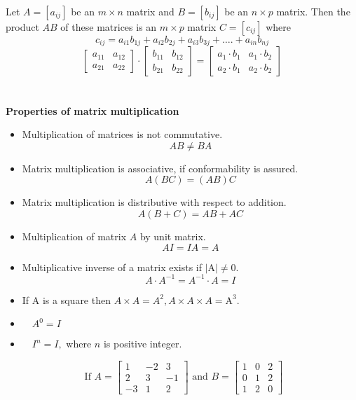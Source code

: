 	 Let $A=\left[a_{i j}\right]$ be an $m \times n$ matrix and $B=\left[b_{i j}\right]$ be an $n \times p$ matrix. Then the product $A B$ of these matrices is an $m \times p$ matrix $C=\left[c_{i j}\right]$ where
	 $$
	 c_{i j}=a_{i 1} b_{1 j}+a_{i 2} b_{2 j}+a_{i 3} b_{3 j}+\ldots .+a_{i n} b_{n j}
	 $$
	 $$\left[\begin{array}{ll}a_{1 1} & a_{1 2} \\ a_{2 1} & a_{2 2 }\end{array}\right] \cdot\left[\begin{array}{ll} b_{1 1} &  b_{1 2} \\b_{2 1} & b_{22 }\end{array}\right]=\left[\begin{array}{ll}{a_{1}} \cdot {b_{1}} & {a_{1}} \cdot b_{2} \\ {a_{2}} \cdot {b_{1}} & {a_{2}} \cdot {b_{2}}\end{array}\right]$$\\\\
	 \textbf{Properties of matrix multiplication}
	 \begin{itemize}
	 	\item Multiplication of matrices is not commutative.
	 	$$
	 	A B \neq B A
	 	$$
	 	\item Matrix multiplication is associative, if conformability is assured.
	 	$$
	 	A(B C)=(A B) C
	 	$$
	 	\item  Matrix multiplication is distributive with respect to addition.
	 	$$
	 	A(B+C)=A B+A C
	 	$$
	 	\item Multiplication of matrix $A$ by unit matrix.
	 	$$
	 	A I=I A=A
	 	$$
	 	\item Multiplicative inverse of a matrix exists if $|\mathrm{A}| \neq 0$.
	 	$$
	 	A \cdot A^{-1}=A^{-1} \cdot A=I
	 	$$
	 	\item  If $\mathrm{A}$ is a square then $A \times A=A^{2}, A \times A \times A=\mathrm{A}^{3}$.
	 	\item  $\quad A^{0}=I$
	 	\item  $\quad I^{n}=I,$ where $n$ is positive integer.
	 \end{itemize}
 \begin{exercise}
 	$$
 	\text {  If } A=\left[\begin{array}{rrr}
 		1 & -2 & 3 \\
 		2 & 3 & -1 \\
 		-3 & 1 & 2
 	\end{array}\right] \text { and } B=\left[\begin{array}{lll}
 		1 & 0 & 2 \\
 		0 & 1 & 2 \\
 		1 & 2 & 0
 	\end{array}\right]
 	$$ \end{exercise}
